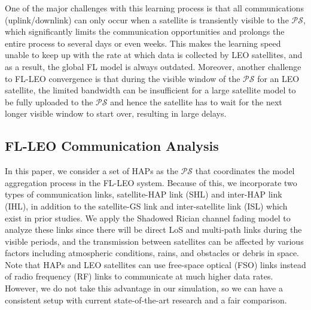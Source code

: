 \documentclass[letter,journal]{IEEEtran}
\begin{document}
One of the major challenges with this learning process is that all communications (uplink/downlink) can only occur when a satellite is transiently visible to the $\mathcal {PS}$, which significantly limits the communication opportunities and prolongs the entire process to several days or even weeks. This makes the learning speed unable to keep up with the rate at which data is collected by LEO satellites, and as a result, the global FL model is always outdated. Moreover, another challenge to FL-LEO convergence is that during the visible window of the $\mathcal {PS}$ for an LEO satellite, the limited bandwidth can be insufficient for a large satellite model to be fully uploaded to the $\mathcal {PS}$ and hence the satellite has to wait for the next longer visible window to start over, resulting in large delays.\vspace{-0.5cm}

\subsection{FL-LEO Communication Analysis}\label{Com_link}

In this paper, we consider a set of HAPs as the $\mathcal {PS}$ that coordinates the model aggregation process in the FL-LEO system. Because of this, we incorporate two types of communication links, satellite-HAP link (SHL) and inter-HAP link (IHL), in addition to the satellite-GS link and inter-satellite link (ISL) which exist in prior studies. We apply the Shadowed Rician channel fading model to analyze these links since there will be direct LoS and multi-path links during the visible periods, and the transmission between satellites can be affected by various factors including atmospheric conditions, rains, and obstacles or debris in space. Note that HAPs and LEO satellites can use free-space optical (FSO) links instead of radio frequency (RF) links to communicate at much higher data rates. However, we do not take this advantage in our simulation, so we can have a consistent setup with current state-of-the-art research and a fair comparison.
\end{document}

